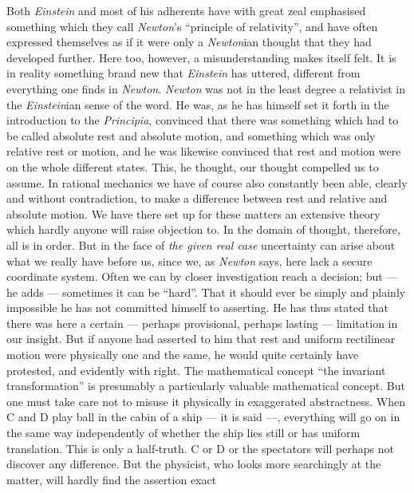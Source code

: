 \documentclass[12pt,a4paper]{article}
\begin{document}
Both \emph{Einstein} and most of his adherents have with great zeal
emphasised something which they call \emph{Newton}'s ``principle of
relativity'', and have often expressed themselves as if it were only a
\emph{Newton}ian thought that they had developed further. Here too, however, a
misunderstanding makes itself felt. It is in reality something brand new that
\emph{Einstein} has uttered, different from everything one finds in
\emph{Newton}. \emph{Newton} was not in the least degree a relativist in the
\emph{Einstein}ian sense of the word. He was, as he has himself set it forth
in the introduction to the \emph{Principia}, convinced that there was
something which had to be called absolute rest and absolute motion, and
something which was only relative rest or motion, and he was likewise
convinced that rest and motion were on the whole different states. This, he
thought, our thought compelled us to assume. In rational mechanics we have of
course also constantly been able, clearly and without contradiction, to make a
difference between rest and relative and absolute motion. We have there set up
for these matters an extensive theory which hardly anyone will raise objection
to. In the domain of thought, therefore, all is in order. But in the face of
\emph{the given real case} uncertainty can arise about what we really have
before us, since we,
as \emph{Newton} says, here lack a secure coordinate system. Often we can by
closer investigation reach a decision; but --- he adds --- sometimes it can be
``hard''. That it should ever be simply and plainly impossible he has not
committed himself to asserting. He has thus stated that there was here a
certain --- perhaps provisional, perhaps lasting --- limitation in our
insight. But if anyone had asserted to him that rest and uniform rectilinear
motion were physically one and the same, he would quite certainly have
protested, and evidently with right. The mathematical concept ``the invariant
transformation'' is presumably a particularly valuable mathematical concept.
But one must take care not to misuse it physically in exaggerated
abstractness. When C and D play ball in the cabin of a ship --- it is said
---, everything will go on in the same way independently of whether the ship
lies still or has uniform translation. This is only a half-truth. C or D or
the spectators will perhaps not discover any difference. But the physicist,
who looks more searchingly at the matter, will hardly find the assertion exact
\end{document}
